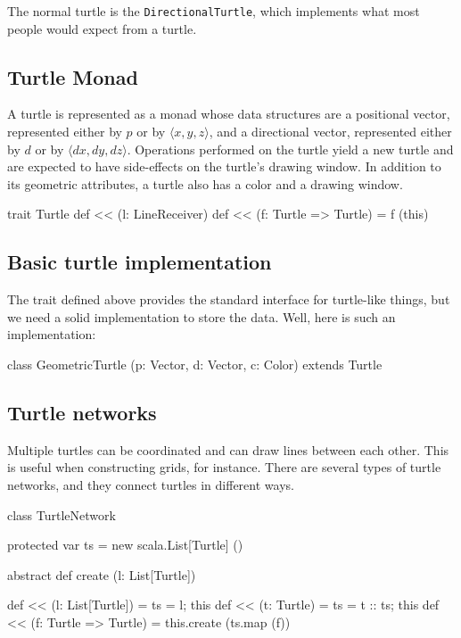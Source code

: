 \documentclass{article}
\begin{document}
      The normal turtle is the {\tt DirectionalTurtle}, which implements what most people would expect from a turtle.

    \subsection{Turtle Monad}
      \label{sec:turtle-monad}

      A turtle is represented as a monad whose data structures are a positional vector, represented either by $p$ or by $\langle x, y, z \rangle$, and a
      directional vector, represented either by $d$ or by $\langle dx, dy, dz \rangle$. Operations performed on the turtle yield a new turtle and are expected to
      have side-effects on the turtle's drawing window. In addition to its geometric attributes, a turtle also has a color and a drawing window.

      \begin{scalacode}
trait Turtle {
  def << (l: LineReceiver)
  def << (f: Turtle => Turtle) = f (this)
}
      \end{scalacode}

    \subsection{Basic turtle implementation}
      \label{sec:basic-turtle-implementation}

      The trait defined above provides the standard interface for turtle-like things, but we need a solid implementation to store the data. Well, here is such
      an implementation:

      \begin{scalacode}
class GeometricTurtle (p: Vector, d: Vector, c: Color) extends Turtle {
  
}
      \end{scalacode}

    \subsection{Turtle networks}
      \label{sec:turtle-networks}

      Multiple turtles can be coordinated and can draw lines between each other. This is useful when constructing grids, for instance. There are several types
      of turtle networks, and they connect turtles in different ways.

      \begin{scalacode}
class TurtleNetwork {
  protected var ts = new scala.List[Turtle] ()

  abstract def create (l: List[Turtle])

  def << (l: List[Turtle])     = {ts = l; this}
  def << (t: Turtle)           = {ts = t :: ts; this}
  def << (f: Turtle => Turtle) = this.create (ts.map (f))
}
      \end{scalacode}
\end{document}

